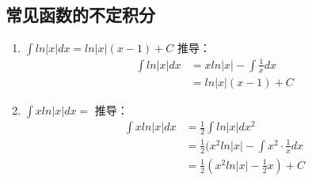 \subsection{常见函数的不定积分}
\begin{enumerate}
\item $\int ln|x|dx = ln|x|(x-1)+C$
推导：
\begin{equation}
    \begin{split}
        \int ln|x|dx &=xln|x|-\int \frac{1}{x}dx\\ 
        &=ln|x|(x-1)+C
    \end{split} 
\end{equation}
\item $\int xln|x|dx = $
推导：
\begin{equation}
    \label{eq:base1}
    \begin{split}
        \int xln|x|dx &=\frac{1}{2}\int ln|x|dx^2\\ 
        &=\frac{1}{2}(x^2ln|x|-\int x^2\cdot\frac{1}{x}dx\\ 
        &=\frac{1}{2}(x^2ln|x|-\frac{1}{2}x)+C
    \end{split}
\end{equation}
\end{enumerate}